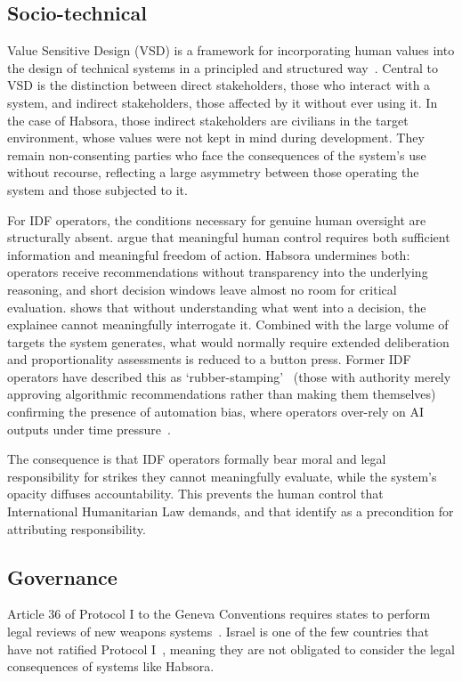 \subsection{Socio-technical}

Value Sensitive Design (VSD) is a framework for incorporating human values into the design of technical systems in a principled and structured way~\citep{friedman2008vsd, friedman2013vsd}. Central to VSD is the distinction between direct stakeholders, those who interact with a system, and indirect stakeholders, those affected by it without ever using it. In the case of Habsora, those indirect stakeholders are civilians in the target environment, whose values were not kept in mind during development. They remain non-consenting parties who face the consequences of the system's use without recourse, reflecting a large asymmetry between those operating the system and those subjected to it.

For IDF operators, the conditions necessary for genuine human oversight are structurally absent. \citet{mhcof} argue that meaningful human control requires both sufficient information and meaningful freedom of action. Habsora undermines both: operators receive recommendations without transparency into the underlying reasoning, and short decision windows leave almost no room for critical evaluation. \citet{miller2018explanationartificialintelligenceinsights} shows that without understanding what went into a decision, the explainee cannot meaningfully interrogate it. Combined with the large volume of targets the system generates, what would normally require extended deliberation and proportionality assessments is reduced to a button press. Former IDF operators have described this as `rubber-stamping'~\citep{kozlovski2024algorithms} (those with authority merely approving algorithmic recommendations rather than making them themselves) confirming the presence of automation bias, where operators over-rely on AI outputs under time pressure~\citep{parasuraman2010complacency}.

The consequence is that IDF operators formally bear moral and legal responsibility for strikes they cannot meaningfully evaluate, while the system's opacity diffuses accountability. This prevents the human control that International Humanitarian Law demands, and that \citet{mhcof} identify as a precondition for attributing responsibility.

\subsection{Governance}
Article 36 of Protocol I to the Geneva Conventions requires states to perform legal reviews of new weapons systems~\citep{icrc_api_article36_1977}. Israel is one of the few countries that have not ratified Protocol I~\citep{icrc_api_stateparties}, meaning they are not obligated to consider the legal consequences of systems like Habsora.


